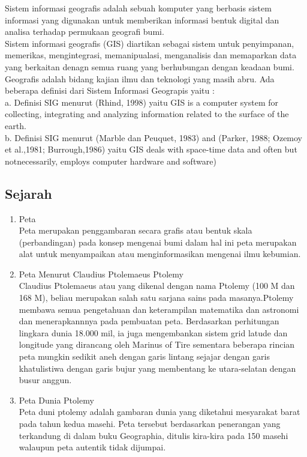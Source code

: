 \begin{enumerate}
Sistem informasi geografis adalah sebuah komputer yang berbasis sistem informasi yang digunakan untuk memberikan informasi bentuk digital dan analisa terhadap permukaan geografi bumi. \\
Sistem informasi geografis (GIS) diartikan sebagai sistem untuk penyimpanan, memerikas, mengintegrasi, memanipualasi, menganalisis dan memaparkan data yang berkaitan denagn semua ruang yang berhubungan dengan keadaan bumi.\\
Geografis adalah bidang kajian ilmu dan teknologi yang masih abru. Ada beberapa definisi dari Sistem Informasi Geograpis yaitu :\\
a. Definisi SIG menurut (Rhind, 1998) yaitu GIS is a computer system for collecting, integrating and analyzing information related to the surface of the earth.\\
b. Definisi SIG menurut (Marble dan Peuquet, 1983) and (Parker, 1988; Ozemoy et al.,1981; Burrough,1986) yaitu GIS deals with space-time data and often but notnecessarily, employs computer hardware and software)\\

\end{enumerate}
\subsection{Sejarah}
\begin{enumerate}
\item Peta\\
Peta merupakan penggambaran secara grafis atau bentuk skala (perbandingan) pada konsep mengenai bumi dalam hal ini peta merupakan alat untuk menyampaikan atau menginformasikan mengenai ilmu kebumian.\\
\item Peta Menurut Claudius Ptolemaeus Ptolemy\\
Claudius Ptolemaeus atau yang dikenal dengan nama Ptolemy (100 M dan 168 M), beliau merupakan salah satu sarjana sains pada masanya.Ptolemy membawa semua pengetahuan dan keterampilan matematika dan astronomi dan menerapkannnya pada pembuatan peta. Berdasarkan perhitungan  lingkara  dunia 18.000 mil, ia juga mengembankan sistem grid latude dan longitude yang dirancang oleh Marinus of Tire sementara beberapa rincian peta mungkin sedikit aneh dengan garis lintang sejajar dengan garis khatulistiwa dengan garis bujur yang membentang ke utara-selatan dengan busur anggun.\\
\item Peta Dunia Ptolemy\\
Peta duni ptolemy adalah gambaran dunia yang diketahui mesyarakat barat pada tahun kedua masehi. Peta tersebut berdasarkan penerangan yang terkandung di dalam buku Geographia, ditulis kira-kira pada 150 masehi walaupun peta autentik tidak dijumpai.\\
\end{enumerate}

